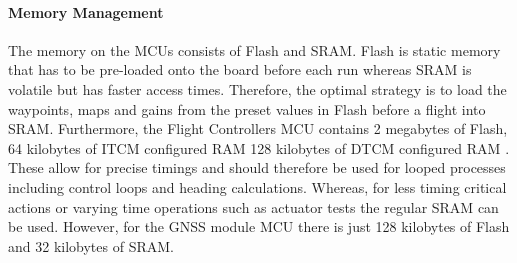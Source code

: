 \paragraph{Memory Management}
The memory on the \gls{MCU}s consists of Flash and \gls{SRAM}. Flash is static memory that has to be pre-loaded onto the board before each run whereas \gls{SRAM} is volatile but has faster access times. Therefore, the optimal strategy is to load the waypoints, maps and gains from the preset values in Flash before a flight into \gls{SRAM}. Furthermore, the Flight Controllers \gls{MCU} contains 2 megabytes of Flash, 64 kilobytes of \gls{ITCM} configured \gls{RAM} 128 kilobytes of \gls{DTCM} configured \gls{RAM} \cite{REF}. These allow for precise timings and should therefore be used for looped processes including control loops and heading calculations. Whereas, for less timing critical actions or varying time operations such as actuator tests the regular \gls{SRAM} can be used. However, for the \gls{GNSS} module \gls{MCU} there is just 128 kilobytes of Flash and 32 kilobytes of \gls{SRAM}.

